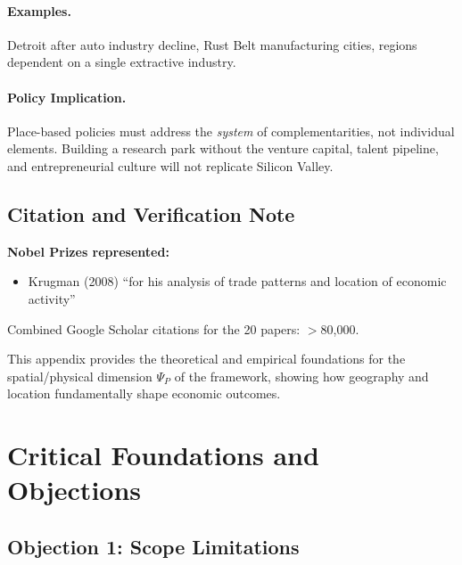 \paragraph{Examples.}
Detroit after auto industry decline, Rust Belt manufacturing cities,
regions dependent on a single extractive industry.

\paragraph{Policy Implication.}
Place-based policies must address the \textit{system} of complementarities,
not individual elements. Building a research park without the venture capital,
talent pipeline, and entrepreneurial culture will not replicate Silicon Valley.

\subsection{Citation and Verification Note}

\textbf{Nobel Prizes represented:}
\begin{itemize}
    \item Krugman (2008) ``for his analysis of trade patterns and location of economic activity''
\end{itemize}

Combined Google Scholar citations for the 20 papers: $>$80,000.

This appendix provides the theoretical and empirical foundations for the 
spatial/physical dimension $\Psi_P$ of the framework, showing how geography 
and location fundamentally shape economic outcomes.




\section{Critical Foundations and Objections}
\label{sec:cts-foundations}

\subsection{Objection 1: Scope Limitations}

